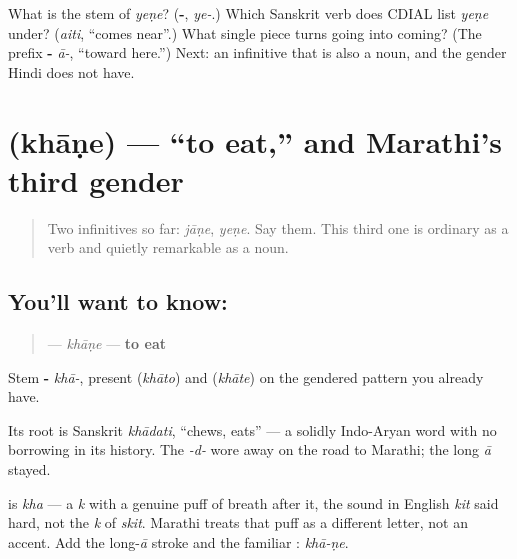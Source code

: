 \begin{tcolorbox}[breakable,colback=teal!4,colframe=teal!35!black,title={Before you move on}]
What is the stem of \emph{yeṇe}? (\textbf{-}, \emph{ye-}.) Which Sanskrit verb does CDIAL list \emph{yeṇe} under? (\emph{aiti}, \textquotedblleft{}comes near\textquotedblright{}.) What single piece turns going into coming? (The prefix \textbf{-} \emph{ā-}, \textquotedblleft{}toward here.\textquotedblright{}) Next: an infinitive that is also a noun, and the gender Hindi does not have.
\end{tcolorbox}
\section[\texorpdfstring{\mr{खाणे} (khāṇe)}{खाणे (khāṇe)}]{ (khāṇe) — \textquotedblleft{}to eat,\textquotedblright{} and Marathi's third gender}

\label{lesson:MR-C07-khane}



\begin{quote}
Two infinitives so far: \emph{jāṇe}, \emph{yeṇe}. Say them. This third one is ordinary as a verb and quietly remarkable as a noun.
\end{quote}

\subsection*{You'll want to know: }
\begin{quote}
\textbf{} — \emph{khāṇe} — \textbf{to eat}
\end{quote}

Stem \textbf{-} \emph{khā-}, present \textbf{} (\emph{khāto}) and \textbf{} (\emph{khāte}) on the gendered pattern you already have.

Its root is Sanskrit \textbf{} \emph{khādati}, \textquotedblleft{}chews, eats\textquotedblright{} — a solidly Indo-Aryan word with no borrowing in its history. The \emph{-d-} wore away on the road to Marathi; the long \emph{ā} stayed.

\begin{sounds}
\textbf{} is \emph{kha} — a \emph{k} with a genuine puff of breath after it, the sound in English \emph{kit} said hard, not the \emph{k} of \emph{skit}. Marathi treats that puff as a different letter, not an accent. Add the long-\emph{ā} stroke and the familiar \textbf{}: \emph{khā-ṇe}.
\end{sounds}

